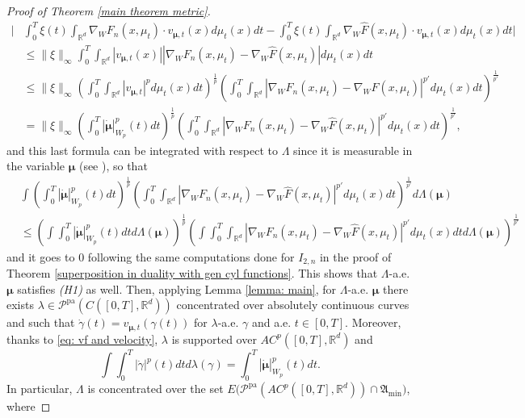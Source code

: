 \documentclass[10pt,leqno]{amsart}
\numberwithin{equation}{section}
\newcommand{\R}{\mathbb{R}}
\newcommand{\PP}{\mathcal{P}}
\newcommand{\PPpa}{\PP^{\operatorname{pa}}}
\begin{document}
\begin{proof}[Proof of Theorem \ref{main theorem metric}]
    \begin{align*} 
    \bigg|& \int_0^T \xi(t) \int_{\R^d} \nabla_WF_n(x,\mu_t)\cdot v_{\boldsymbol{\mu},t}(x) d\mu_t(x) dt - \int_0^T \xi(t) \int_{\R^d} \nabla_W\hat{F}(x,\mu_t)\cdot v_{\boldsymbol{\mu},t}(x) d\mu_t(x) dt \bigg| 
    \\
    & \leq \|\xi\|_\infty \int_0^T \int_{\R^d} |v_{\boldsymbol{\mu},t}(x)| |\nabla_W F_n(x,\mu_t) - \nabla_W\hat{F}(x,\mu_t)| d\mu_t(x) dt
    \\
    & \leq \|\xi\|_\infty \left( \int_{0}^T \int_{\R^d} |v_{\boldsymbol{\mu},t}|^pd\mu_t(x) dt \right)^{\frac{1}{p}}\left( \int_0^T \int_{\R^d} |\nabla_W F_n(x,\mu_t) - \nabla_W\hat{F}(x,\mu_t)|^{p'} d\mu_t(x) dt \right)^{\frac{1}{p'}}
    \\
    & = \|\xi\|_\infty \left( \int_{0}^T |\dot{\boldsymbol{\mu}}|_{W_p}^p(t) dt \right)^{\frac{1}{p}}\left( \int_0^T \int_{\R^d} |\nabla_W F_n(x,\mu_t) - \nabla_W\hat{F}(x,\mu_t)|^{p'} d\mu_t(x) dt \right)^{\frac{1}{p'}},
    \end{align*}
    and this last formula can be integrated with respect to $\Lambda$ since it is measurable in the variable $\boldsymbol{\mu}$ (see \cite[Appendix D]{pinzisavare2025}), so that 
    \begin{align*}
        & \int  \left( \int_{0}^T |\dot{\boldsymbol{\mu}}|_{W_p}^p(t) dt \right)^{\frac{1}{p}}\left( \int_0^T \int_{\R^d} |\nabla_W F_n(x,\mu_t) - \nabla_W\hat{F}(x,\mu_t)|^{p'} d\mu_t(x) dt \right)^{\frac{1}{p'}} d\Lambda(\boldsymbol{\mu}) 
        \\
        & \leq \left( \int \int_{0}^T |\dot{\boldsymbol{\mu}}|_{W_p}^p(t) dt d\Lambda(\boldsymbol{\mu}) \right)^{\frac{1}{p}}\left( \int \int_0^T \int_{\R^d} |\nabla_W F_n(x,\mu_t) - \nabla_W\hat{F}(x,\mu_t)|^{p'} d\mu_t(x) dt d\Lambda(\boldsymbol{\mu})\right)^{\frac{1}{p'}}
    \end{align*}
    and it goes to $0$ following the same computations done for $I_{2,n}$ in the proof of Theorem \ref{superposition in duality with gen cyl functions}. This shows that $\Lambda$-a.e. $\boldsymbol{\mu}$ satisfies \textit{(H1)} as well. Then, applying Lemma \ref{lemma: main}, for $\Lambda$-a.e. $\boldsymbol{\mu}$ there exists $\lambda \in \PPpa(C([0,T],\R^d))$ concentrated over absolutely continuous curves and such that $\dot\gamma(t) = v_{\boldsymbol{\mu},t}(\gamma(t))$ for $\lambda$-a.e. $\gamma$ and a.e. $t\in[0,T]$. Moreover, thanks to \eqref{eq: vf and velocity}, $\lambda$ is supported over $AC^p([0,T],\R^d)$ and 
    \[\int \int_0^T |\dot\gamma|^p(t)dt d\lambda(\gamma) = \int_0^T |\dot{\boldsymbol{\mu}}|_{W_p}^p(t)dt.\] In particular, $\Lambda$ is concentrated over the set $E\big( \PPpa(AC^p([0,T],\R^d)) \cap \mathfrak{A}_{\min} \big)$, where 

\end{proof}
\end{document}
